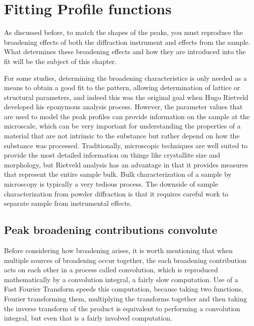 \chapter{Fitting Profile functions}
\label{Chap:profile}

As discussed before, to match the shapes of the peaks, you must reproduce the broadening effects of both the diffraction instrument and effects from the sample. 
What determines these broadening effects and how they are introduced into the fit will be the subject of this chapter. 

For some studies, determining the broadening characteristics is only needed as a means to obtain a good fit to the pattern, allowing determination of lattice or structural parameters, and indeed this was the original goal when Hugo Rietveld developed his eponymous analysis process. However, the parameter values that are used to model the peak profiles can provide information on the sample at the microscale, which can be very important for understanding the properties of a material that are not intrinsic to the substance but rather depend on how the substance was processed. Traditionally, microscopic techniques are well suited to provide the most detailed information on things like crystallite size and morphology, but Rietveld analysis has an advantage in that it provides measures that represent the entire sample bulk. Bulk characterization of a sample by microscopy is typically a very tedious process. The downside of sample characterization from powder diffraction is that it requires careful work to separate sample from instrumental effects.

 

\section{Peak broadening contributions convolute}

Before considering how broadening arises, it is worth mentioning that when multiple sources of broadening occur together, the each broadening contribution acts on each other in a process called convolution, which is reproduced mathematically by a convolution integral, a fairly slow computation. Use of a Fast Fourier Transform speeds this computation, because taking two functions, Fourier transforming them, multiplying the transforms together and then taking the inverse transform of the product is equivalent to performing a convolution integral, but even that is a fairly involved computation. 

